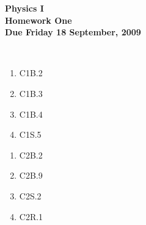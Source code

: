 \documentclass[12pt]{article}
\begin{document}
\pagestyle{empty}
 
\begin{center}
{\large {\bf Physics I}}\\
\medskip
{\large {\bf Homework One}}\\
\medskip
{ {\bf Due Friday 18 September, 2009}}\\
\end{center}

\hspace{2mm}\\


\begin{enumerate}
\setlength{\itemsep}{-1mm}
  \item C1B.2
  \item C1B.3
  \item C1B.4
  \item C1S.5

\end{enumerate}



\begin{enumerate}
\setlength{\itemsep}{-1mm}
  \item C2B.2
  \item C2B.9
  \item C2S.2
  \item C2R.1

\end{enumerate}
\end{document}
